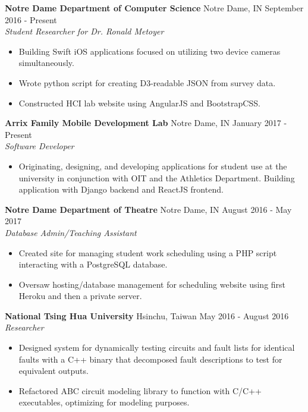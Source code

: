 \documentclass[9pt]{article}
\begin{document}
    \textbf{Notre Dame Department of Computer Science}
    \tab
    Notre Dame, IN
    \hfill
    September 2016 - Present
    \\
    \textit{Student Researcher for Dr. Ronald Metoyer}
    \begin{itemize}
      \item Building Swift iOS applications focused on utilizing two device cameras simultaneously.
      \item Wrote python script for creating D3-readable JSON from survey data.
      \item Constructed HCI lab website using AngularJS and BootstrapCSS.
    \end{itemize}
    
    \textbf{Arrix Family Mobile Development Lab}
    \tab
    Notre Dame, IN
    \hfill
    January 2017 - Present
    \\
    \textit{Software Developer}
    \begin{itemize}
      \item Originating, designing, and developing applications for student use at the university in conjunction with OIT and the Athletics Department. Building application with Django backend and ReactJS frontend.
    \end{itemize}
    
    \textbf{Notre Dame Department of Theatre}
    \tab
    Notre Dame, IN  
    \hfill
    August 2016 - May 2017
    \\
    \textit{Database Admin/Teaching Assistant}
    \begin{itemize}
      \item Created site for managing student work scheduling using a PHP script interacting with a PostgreSQL database.
      \item Oversaw hosting/database management for scheduling website using first Heroku and then a private server.
    \end{itemize}
    
    \textbf{National Tsing Hua University}
    \tab
    Hsinchu, Taiwan
    \hfill
    May 2016 - August 2016
    \\
    \textit{Researcher}
    \begin{itemize}
      \item Designed system for dynamically testing circuits and fault lists for identical faults with a C++ binary that decomposed fault descriptions to test for equivalent outputs.
      \item Refactored ABC circuit modeling library to function with C/C++ executables, optimizing for modeling purposes.
    \end{itemize}
    
\end{document}
